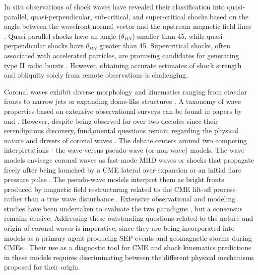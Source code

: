 In situ observations of shock waves have revealed their classification into quasi-parallel, quasi-perpendicular, sub-critical, and super-critical shocks based on the angle between the wavefront normal vector and the upstream magnetic field lines \cite{tsurutani_1985}. Quasi-parallel shocks have an angle ($\theta_{BN}$) smaller than 45\degree, while quasi-perpendicular shocks have $\theta_{BN}$ greater than 45\degree. Supercritical shocks, often associated with accelerated particles, are promising candidates for generating type II radio bursts \cite{benz_1988}. However, obtaining accurate estimates of shock strength and obliquity solely from remote observations is challenging.

Coronal waves exhibit diverse morphology and kinematics ranging from circular fronts to narrow jets or expanding dome-like structures \citep{veronig_2010}. A taxonomy of wave properties based on extensive observational surveys can be found in papers by \citet{muhr_2014} and \citet{nitta_2013}. However, despite being observed for over two decades since their serendipitous discovery, fundamental questions remain regarding the physical nature and drivers of coronal waves \citep{chen_2016, vrsnak_2008, warmuth_2015}. The debate centers around two competing interpretations - the wave versus pseudo-wave (or non-wave) models. The wave models envisage coronal waves as fast-mode MHD waves or shocks that propagate freely after being launched by a CME lateral over-expansion or an initial flare pressure pulse \citep{wills_2007, vrsnak_2008}. The pseudo-wave models interpret them as bright fronts produced by magnetic field restructuring related to the CME lift-off process rather than a true wave disturbance \citep{delannee_1999, chen_2002}. Extensive observational and modeling studies have been undertaken to evaluate the two paradigms \citep{patsourakos_2012, long_2017}, but a consensus remains elusive. Addressing these outstanding questions related to the nature and origin of coronal waves is imperative, since they are being incorporated into models as a primary agent producing SEP events and geomagnetic storms during CMEs \citep{rouillard_2012, park_2013}. Their use as a diagnostic tool for CME and shock kinematics predictions in these models requires discriminating between the different physical mechanisms proposed for their origin.

